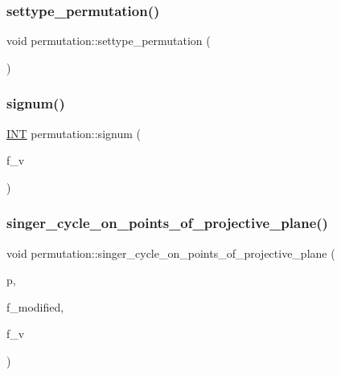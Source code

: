 \mbox{\label{classpermutation_af1eea29f86195cede9562e444664c28c}} 
\subsubsection{\texorpdfstring{settype\+\_\+permutation()}{settype\_permutation()}}
{\footnotesize\ttfamily void permutation\+::settype\+\_\+permutation (\begin{DoxyParamCaption}{ }\end{DoxyParamCaption})}

\mbox{\label{classpermutation_a51cfe6b579a1d45524f39096c22c4398}} 
\subsubsection{\texorpdfstring{signum()}{signum()}}
{\footnotesize\ttfamily \mbox{\hyperlink{galois_8h_a09fddde158a3a20bd2dcadb609de11dc}{I\+NT}} permutation\+::signum (\begin{DoxyParamCaption}\item[{\mbox{\hyperlink{galois_8h_a09fddde158a3a20bd2dcadb609de11dc}{I\+NT}}}]{f\+\_\+v }\end{DoxyParamCaption})}

\mbox{\label{classpermutation_a013701d741e69609903a93f3874308f4}} 
\subsubsection{\texorpdfstring{singer\+\_\+cycle\+\_\+on\+\_\+points\+\_\+of\+\_\+projective\+\_\+plane()}{singer\_cycle\_on\_points\_of\_projective\_plane()}}
{\footnotesize\ttfamily void permutation\+::singer\+\_\+cycle\+\_\+on\+\_\+points\+\_\+of\+\_\+projective\+\_\+plane (\begin{DoxyParamCaption}\item[{\mbox{\hyperlink{galois_8h_a09fddde158a3a20bd2dcadb609de11dc}{I\+NT}}}]{p,  }\item[{\mbox{\hyperlink{galois_8h_a09fddde158a3a20bd2dcadb609de11dc}{I\+NT}}}]{f\+\_\+modified,  }\item[{\mbox{\hyperlink{galois_8h_a09fddde158a3a20bd2dcadb609de11dc}{I\+NT}}}]{f\+\_\+v }\end{DoxyParamCaption})}

